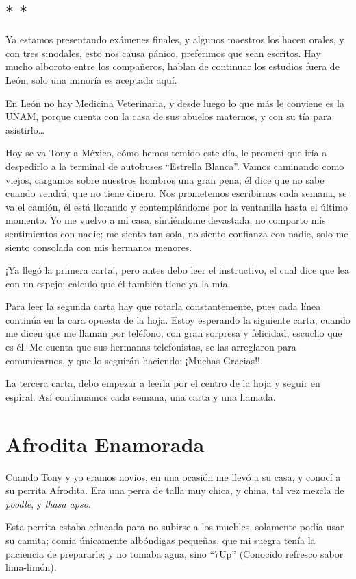 \documentclass[letterpaper, 12pt]{book}
\begin{document}
\section*{\centering * * *}
Ya estamos presentando exámenes finales, y algunos maestros los hacen orales, y con tres sinodales, esto nos causa pánico, preferimos que sean escritos. Hay mucho alboroto entre los compañeros, hablan de continuar los estudios fuera de León, solo una minoría es aceptada aquí.

En León no hay Medicina Veterinaria, y desde luego lo que más le conviene es la UNAM, porque cuenta con la casa de sus abuelos maternos, y con su tía para asistirlo\ldots

Hoy se va Tony a México, cómo hemos temido este día, le prometí que iría a despedirlo a la terminal de autobuses ``Estrella Blanca''. Vamos caminando como viejos, cargamos sobre nuestros hombros una gran pena; él dice que no sabe cuando vendrá, que no tiene dinero. Nos prometemos escribirnos cada semana, se va el camión, él está llorando y contemplándome por la ventanilla hasta el último momento. Yo me vuelvo a mi casa, sintiéndome devastada, no comparto mis sentimientos con nadie; me siento tan sola, no siento confianza con nadie, solo me siento consolada con mis hermanos menores. 

¡Ya llegó la primera carta!, pero antes debo leer el instructivo, el cual dice que lea con un espejo; calculo que él también tiene ya la mía. 

Para leer la segunda carta hay que rotarla constantemente, pues cada línea continúa en la cara opuesta de la hoja. Estoy esperando la siguiente carta, cuando me dicen que me llaman por teléfono, con gran sorpresa y felicidad, escucho que es él. Me cuenta que sus hermanas telefonistas, se las arreglaron para comunicarnos, y que lo seguirán haciendo: ¡Muchas Gracias!!.

La tercera carta, debo empezar a leerla por el centro de la hoja y seguir en espiral. Así continuamos cada semana, una carta y una llamada. 

\chapter{Afrodita Enamorada}
Cuando Tony y yo eramos novios, en una ocasión me llevó a su casa, y conocí a su perrita Afrodita. Era una perra de talla muy chica, y china, tal vez mezcla de \textit{poodle}, y \textit{lhasa apso}. 

Esta perrita estaba educada para no subirse a los muebles, solamente podía usar su camita; comía únicamente albóndigas pequeñas, que mi suegra tenía la paciencia de prepararle; y no tomaba agua, sino ``7Up'' (Conocido refresco sabor lima-limón).
\end{document}
